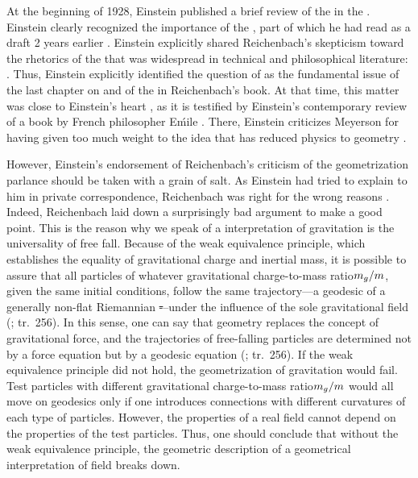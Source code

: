 \documentclass[submitted]{article}
\newcommand{\ctmr}{charge-to-mass ratio\xspace}
\newcommand{\ctmrg}{\ensuremath{\hfrac{m_g}{m}}\xspace}
\renewcommand{\me}{;~m.e.{}}
\newcommand{\PRZL}{\citetitle{Reichenbach1928}\xspace}
\renewcommand{\rzlp}[2]{(\cite[#1]{Reichenbach1928}; tr.\ #2)\xspace}
\begin{document}
At the beginning of 1928, Einstein published a brief review of the \PRZL \citep{Einstein1928d} in the . Einstein clearly recognized the importance of the \Ap, part of which he had read as a draft 2 years earlier . Einstein explicitly shared Reichenbach's skepticism toward the rhetorics of the  that was widespread in technical and philosophical literature:  \citep[][20\me]{Einstein1928d}. Thus, Einstein explicitly identified the question of  as the fundamental issue of the last chapter on \gr and of the \Ap in Reichenbach's book. At that time, this matter was close to Einstein's heart \citep{Lehmkuhl2014}, as it is testified by Einstein's contemporary review \citep{Einstein1928} of a book by French philosopher E\'mile \citet{Meyerson1925}. There, Einstein criticizes Meyerson for having given too much weight to the idea that \gr has reduced physics to geometry .

However, Einstein's endorsement of Reichenbach's criticism of the geometrization parlance should be taken with a grain of salt. As Einstein had tried to explain to him in private correspondence, Reichenbach was right for the wrong reasons . Indeed, Reichenbach laid down a surprisingly bad argument to make a good point. This is the reason why we speak of a  interpretation of gravitation is the universality of free fall. Because of the weak equivalence principle, which establishes the equality of gravitational charge and inertial mass, it is possible to assure that all particles of whatever gravitational \ctmr \ctmrg, given the same initial conditions, follow the same trajectory---a geodesic of a generally non-flat Riemannian \st---under the influence of the sole gravitational field \rzlp{293}{256}. In this sense, one can say that geometry replaces the concept of gravitational force, and the trajectories of free-falling particles are determined not by a force equation but by a geodesic equation \rzlp{293}{256}. If the weak equivalence principle did not hold, the geometrization of gravitation would fail. Test particles with different gravitational \ctmr \ctmrg would all move on geodesics only if one introduces connections with different curvatures of each type of particles. However, the properties of a real field cannot depend on the properties of the test particles. Thus, one should conclude that without the weak equivalence principle, the geometric description of a geometrical interpretation of field breaks down. 
\end{document}

